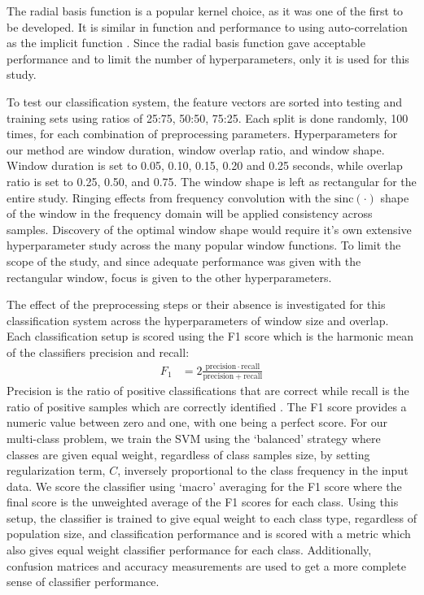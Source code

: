 The radial basis function is a popular kernel choice, as it was one of the first to be developed.
It is similar in function and performance to using auto-correlation as the 
 implicit function \cite{kong2007autocorrelation}.
Since the radial basis function gave acceptable performance 
 and to limit the number of hyperparameters, only it is used for this study.

To test our classification system, the feature vectors are sorted into testing and training sets
using ratios of 25:75, 50:50, 75:25. Each split is done randomly, 100 times, for each combination of
preprocessing parameters. Hyperparameters for our method are window duration, window overlap ratio, and window shape.
Window duration is set to 0.05, 0.10, 0.15, 0.20 and 0.25 seconds, 
 while overlap ratio is set to 0.25, 0.50, and 0.75. 
The window shape is left as rectangular for the entire study.
Ringing effects from frequency convolution with the $\mathrm{sinc}(\cdot)$ shape of the window in the
 frequency domain will be applied consistency across samples.
Discovery of the optimal window shape would require it's own extensive hyperparameter study
 across the many popular window functions. 
To limit the scope of the study, and since adequate performance was given with the rectangular window,
 focus is given to the other hyperparameters.

The effect of the preprocessing steps or their absence is investigated for this classification system
 across the hyperparameters of window size and overlap.
Each classification setup is scored using the F1 score \cite{sasaki2007truth, powers2020evaluation} 
 which is the harmonic mean of the classifiers precision and recall:
\begin{align}
F_1 &= 2 \frac{\mathrm{precision} \cdot \mathrm{recall}}{\mathrm{precision} + \mathrm{recall}}
\end{align}
Precision is the ratio of positive classifications that are correct while recall is the ratio of 
 positive samples which are correctly identified \cite{powers2020evaluation}.
The F1 score provides a numeric value between zero and one, with one being a perfect score. 
For our multi-class problem, we train the SVM using the `balanced' strategy where classes 
 are given equal weight, regardless of class samples size, by setting regularization term, $C$,
 inversely proportional to the class frequency in the input data.
We score the classifier using `macro' averaging for the F1 score
 where the final score is the unweighted average of the F1 scores for each class.
Using this setup, the classifier is trained to give equal weight to each class type,
  regardless of population size, and classification 
 performance and is scored with a metric which also gives equal weight classifier performance
 for each class. Additionally, confusion matrices and accuracy measurements are 
 used to get a more complete sense of classifier performance.

